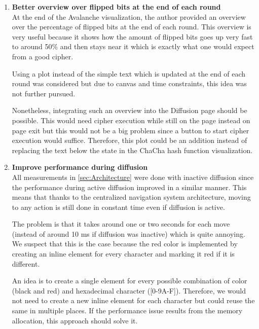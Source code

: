\begin{enumerate}[wide, labelwidth=!, labelindent=0pt]
\setlength{\parskip}{0pt}

\item \textbf{Better overview over flipped bits at the end of each round}\\
At the end of the Avalanche visualization, the author provided an overview over the percentage of flipped bits at the end of each round. This overview is very useful because it shows how the amount of flipped bits goes up very fast to around 50\% and then stays near it which is exactly what one would expect from a good cipher.

Using a plot instead of the simple text which is updated at the end of each round was considered but due to canvas and time constraints, this idea was not further pursued. 

Nonetheless, integrating such an overview into the Diffusion page should be possible. This would need cipher execution while still on the page instead on page exit but this would not be a big problem since a button to start cipher execution would suffice. Therefore, this plot could be an addition instead of replacing the text below the state in the ChaCha hash function visualization.

\vfill
\pagebreak

\item \textbf{Improve performance during diffusion}\\
All measurements in \autoref{sec:Architecture} were done with inactive diffusion since the performance during active diffusion improved in a similar manner. This means that thanks to the centralized navigation system architecture, moving to any action is still done in constant time even if diffusion is active.

The problem is that it takes around one or two seconds for each move (instead of around 10 ms if diffusion was inactive) which is quite annoying. We suspect that this is the case because the red color is implemented by creating an inline element for every character and marking it red if it is different.

An idea is to create a single element for every possible combination of color (black and red) and hexadecimal character ([0-9A-F]). Therefore, we would not need to create a new inline element for each character but could reuse the same in multiple places. If the performance issue results from the memory allocation, this approach should solve it. 


\end{enumerate}
